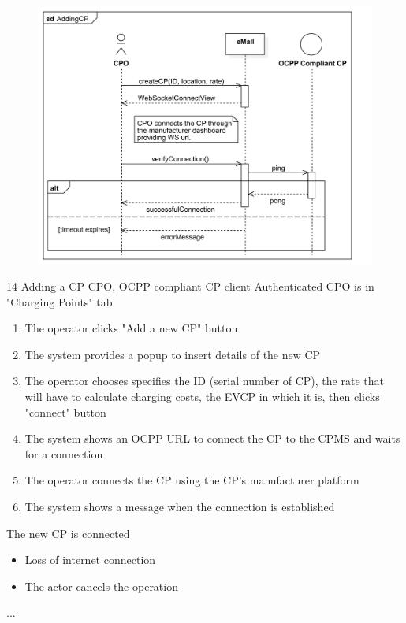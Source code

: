 \pagebreak
\usecase
{
    \begin{figure}[H]
        \centering
        \includegraphics[scale=0.9]{src/sequence_diagram/addingCP.png}
    \end{figure}
}
{14}
{Adding a CP} %
{CPO, OCPP compliant CP client} %
{Authenticated CPO is in "Charging Points" tab} %
{ %
    \begin{enumerate}
        \item The operator clicks "Add a new CP" button
        \item The system provides a popup to insert details of the new CP
        \item The operator chooses specifies the ID (serial number of CP), the rate that will have to calculate charging costs, the EVCP in which it is, then clicks "connect" button
        \item The system shows an OCPP URL to connect the CP to the CPMS and waits for a connection
        \item The operator connects the CP using the CP's manufacturer platform
        \item The system shows a message when the connection is established
    \end{enumerate}
}
{The new CP is connected} %
{ %
    \begin{itemize}
        \item Loss of internet connection
        \item The actor cancels the operation
    \end{itemize}
}
{ %
    ...
}

